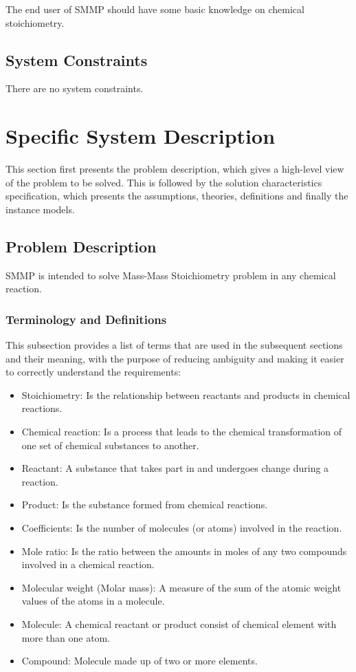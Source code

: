 \documentclass[12pt]{article}
\begin{document}
The end user of SMMP should have some basic knowledge on chemical stoichiometry.

\subsection{System Constraints}

There are no system constraints.

\section{Specific System Description}

This section first presents the problem description, which gives a high-level
view of the problem to be solved.  This is followed by the solution
characteristics specification, which presents the assumptions, theories,
definitions and finally the instance models.

\subsection{Problem Description} \label{Sec_pd}

SMMP is intended to solve Mass-Mass Stoichiometry problem in any chemical
reaction.

\subsubsection{Terminology and  Definitions}

This subsection provides a list of terms that are used in the subsequent
sections and their meaning, with the purpose of reducing ambiguity and making it
easier to correctly understand the requirements:

\begin{itemize}

\item Stoichiometry: Is the relationship between reactants and products in
  chemical reactions.
\item Chemical reaction: Is a process that leads to the chemical transformation
  of one set of chemical substances to another.
\item Reactant: A substance that takes part in and undergoes change during a
  reaction.
\item Product: Is the substance formed from chemical reactions.
\item Coefficients: Is the number of molecules (or atoms) involved in the
  reaction.
\item Mole ratio: Is the ratio between the amounts in moles of any two compounds
  involved in a chemical reaction.
\item Molecular weight (Molar mass): A measure of the sum of the atomic weight
  values of the atoms in a molecule.
\item Molecule: A chemical reactant or product consist of chemical element with
  more than one atom.
\item Compound: Molecule made up of two or more elements.
\end{itemize}
\end{document}
